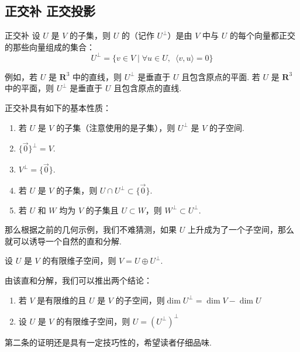 \subsection{正交补 \quad 正交投影}

\begin{definition}{正交补}{} 
    设 $ U $ 是 $ V $ 的子集，则 $ U $ 的（记作 $ U^{\perp } $）是由 $ V $ 中与 $ U $ 的每个向量都正交的那些向量组成的集合：
    \[U^{\perp } = \{ v \in V \mid \forall u \in U, \enspace \langle v, u\rangle = 0\}\]
\end{definition}

例如，若 $ U $ 是 $ \mathbf{R}^{3} $ 中的直线，则 $ U^{\perp } $ 是垂直于 $ U $ 且包含原点的平面. 若 $ U $ 是 $ \mathbf{R}^{3} $ 中的平面，则 $ U^{\perp } $ 是垂直于 $ U $ 且包含原点的直线.

正交补具有如下的基本性质：
\begin{enumerate}
    \item 若 $ U $ 是 $ V $ 的子集（注意使用的是子集），则 $ U^{\perp }$ 是 $ V $ 的子空间.

    \item $ \{ \vec{0} \}^{\perp } = V $.

    \item $ V^{\perp } = \{ \vec{0} \} $.

    \item 若 $ U $ 是 $ V $ 的子集，则 $ U \cap U^{\perp } \subset \{ \vec{0} \}$.

    \item 若 $ U $ 和 $ W $ 均为 $ V $ 的子集且 $ U \subset W $，则 $ W^{\perp } \subset U^{\perp }$.
\end{enumerate}

那么根据之前的几何示例，我们不难猜测，如果 $ U $ 上升成为了一个子空间，那么就可以诱导一个自然的直和分解.

\begin{theorem}{}{}
    设 $ U $ 是 $ V $ 的有限维子空间，则 $ V = U \oplus U^{\perp } $.
\end{theorem}

由该直和分解，我们可以推出两个结论：
\begin{enumerate}
    \item 若 $ V $ 是有限维的且 $ U $ 是 $ V $ 的子空间，则$ \dim U^{\perp }= \dim V - \dim U$

    \item 设 $ U $ 是 $ V $ 的有限维子空间，则 $ U = (U^{\perp})^{\perp} $
\end{enumerate}
第二条的证明还是具有一定技巧性的，希望读者仔细品味.

